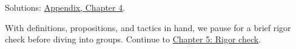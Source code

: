 Solutions: \hyperref[sec:14-appendix-solutions:03-chapter-4:1]{Appendix, Chapter 4}.

With definitions, propositions, and tactics in hand, we pause for a brief rigor check before diving into groups. Continue to \hyperref[sec:05-rigor-check:00-index:1]{Chapter 5: Rigor check}.
